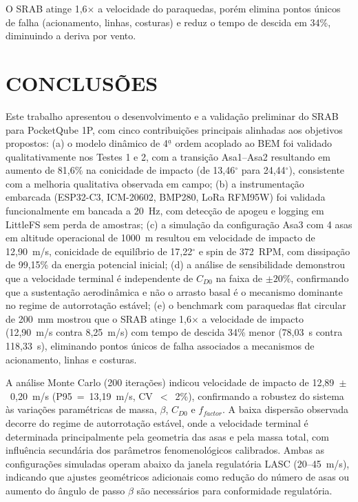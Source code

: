 \documentclass[12pt,fleqn]{article}
\begin{document}
O SRAB atinge 1,6$\times$ a velocidade do paraquedas, porém elimina pontos únicos de falha (acionamento, linhas, costuras) e reduz o tempo de descida em 34\%, diminuindo a deriva por vento.


\section{CONCLUSÕES}

Este trabalho apresentou o desenvolvimento e a validação preliminar do SRAB para PocketQube 1P, com cinco contribuições principais alinhadas aos objetivos propostos: (a) o modelo dinâmico de 4$^{\underline{a}}$ ordem acoplado ao BEM foi validado qualitativamente nos Testes 1 e 2, com a transição Asa1--Asa2 resultando em aumento de 81,6\% na conicidade de impacto (de 13,46$^\circ$ para 24,44$^\circ$), consistente com a melhoria qualitativa observada em campo; (b) a instrumentação embarcada (ESP32-C3, ICM-20602, BMP280, LoRa RFM95W) foi validada funcionalmente em bancada a 20~Hz, com detecção de apogeu e logging em LittleFS sem perda de amostras; (c) a simulação da configuração Asa3 com 4 asas em altitude operacional de 1000~m resultou em velocidade de impacto de 12,90~m/s, conicidade de equilíbrio de 17,22$^\circ$ e spin de 372~RPM, com dissipação de 99,15\% da energia potencial inicial; (d) a análise de sensibilidade demonstrou que a velocidade terminal é independente de $C_{D0}$ na faixa de $\pm20\%$, confirmando que a sustentação aerodinâmica e não o arrasto basal é o mecanismo dominante no regime de autorrotação estável; (e) o benchmark com paraquedas flat circular de 200~mm mostrou que o SRAB atinge 1,6$\times$ a velocidade de impacto (12,90~m/s contra 8,25~m/s) com tempo de descida 34\% menor (78,03~s contra 118,33~s), eliminando pontos únicos de falha associados a mecanismos de acionamento, linhas e costuras.

A análise Monte Carlo (200 iterações) indicou velocidade de impacto de 12,89~$\pm$~0,20~m/s (P95~=~13,19~m/s, CV~$<$~2\%), confirmando a robustez do sistema às variações paramétricas de massa, $\beta$, $C_{D0}$ e $f_{factor}$. A baixa dispersão observada decorre do regime de autorrotação estável, onde a velocidade terminal é determinada principalmente pela geometria das asas e pela massa total, com influência secundária dos parâmetros fenomenológicos calibrados. Ambas as configurações simuladas operam abaixo da janela regulatória LASC (20--45~m/s), indicando que ajustes geométricos adicionais como redução do número de asas ou aumento do ângulo de passo $\beta$ são necessários para conformidade regulatória.
\end{document}
